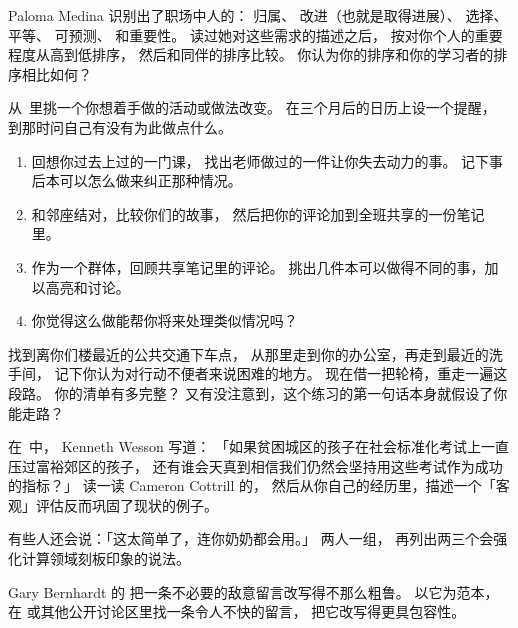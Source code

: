 Paloma Medina 识别出了职场中人的：
归属、
改进（也就是取得进展）、
选择、
平等、
可预测、
和重要性。
读过她对这些需求的描述之后，
按对你个人的重要程度从高到低排序，
然后和同伴的排序比较。
你认为你的排序和你的学习者的排序相比如何？


从~\cite{Lee2017}里挑一个你想着手做的活动或做法改变。
在三个月后的日历上设一个提醒，
到那时问自己有没有为此做点什么。


\begin{enumerate}
\item
  回想你过去上过的一门课，
  找出老师做过的一件让你失去动力的事。
  记下事后本可以怎么做来纠正那种情况。
\item
  和邻座结对，比较你们的故事，
  然后把你的评论加到全班共享的一份笔记里。
\item
  作为一个群体，回顾共享笔记里的评论。
  挑出几件本可以做得不同的事，加以高亮和讨论。
\item
  你觉得这么做能帮你将来处理类似情况吗？
\end{enumerate}


找到离你们楼最近的公共交通下车点，
从那里走到你的办公室，再走到最近的洗手间，
记下你认为对行动不便者来说困难的地方。
现在借一把轮椅，重走一遍这段路。
你的清单有多完整？
又有没注意到，这个练习的第一句话本身就假设了你能走路？


在~\cite{Litt2004}中，
Kenneth Wesson 写道：
「如果贫困城区的孩子在社会标准化考试上一直压过富裕郊区的孩子，
还有谁会天真到相信我们仍然会坚持用这些考试作为成功的指标？」
读一读 Cameron Cottrill 的，
然后从你自己的经历里，描述一个「客观」评估反而巩固了现状的例子。


有些人还会说：「这太简单了，连你奶奶都会用。」
两人一组，
再列出两三个会强化计算领域刻板印象的说法。


Gary Bernhardt 的
把一条不必要的敌意留言改写得不那么粗鲁。
以它为范本，
在  或其他公开讨论区里找一条令人不快的留言，
把它改写得更具包容性。

